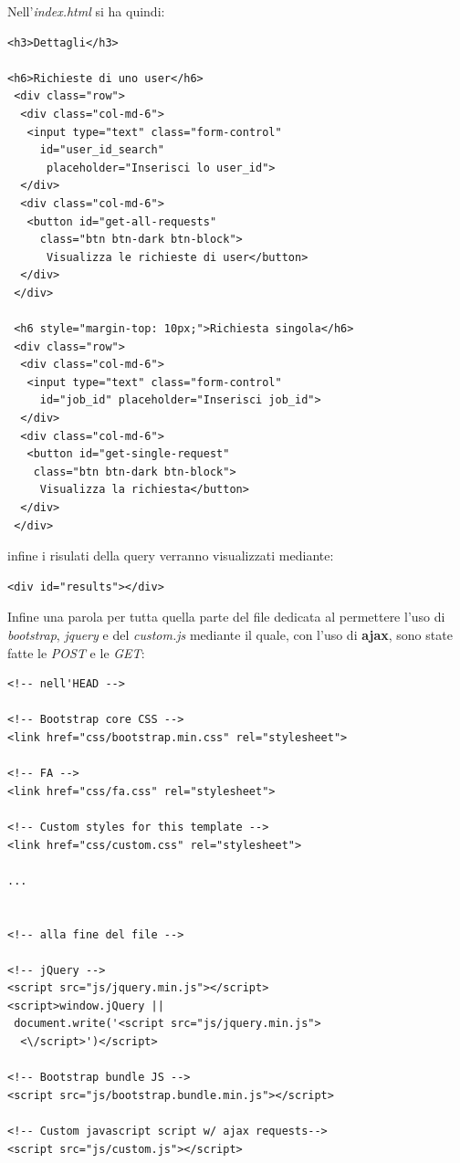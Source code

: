 \documentclass[a4paper,12pt, oneside]{book}
\begin{document}
\newpage
Nell'\textit{index.html} si ha quindi:
\begin{center}
\begin{verbatim}
<h3>Dettagli</h3>

<h6>Richieste di uno user</h6>
 <div class="row">
  <div class="col-md-6">
   <input type="text" class="form-control"
     id="user_id_search"
      placeholder="Inserisci lo user_id">
  </div>
  <div class="col-md-6">
   <button id="get-all-requests"
     class="btn btn-dark btn-block">
      Visualizza le richieste di user</button>
  </div>
 </div>

 <h6 style="margin-top: 10px;">Richiesta singola</h6>
 <div class="row">
  <div class="col-md-6">
   <input type="text" class="form-control"
     id="job_id" placeholder="Inserisci job_id">
  </div>
  <div class="col-md-6">
   <button id="get-single-request"
    class="btn btn-dark btn-block">
     Visualizza la richiesta</button>
  </div>
 </div>
\end{verbatim}
\end{center}
infine i risulati della query verranno visualizzati mediante:
\begin{shaded}
\begin{verbatim}
<div id="results"></div>
\end{verbatim}
\end{shaded}
\newpage
Infine una parola per tutta quella parte del file dedicata al permettere l'uso di \textit{bootstrap}, \textit{jquery}
e del \textit{custom.js} mediante il quale, con l'uso di \textbf{ajax}, sono state fatte le \textit{POST} e le \textit{GET}:
\begin{shaded}
\begin{verbatim}
<!-- nell'HEAD -->
    
<!-- Bootstrap core CSS -->
<link href="css/bootstrap.min.css" rel="stylesheet">

<!-- FA -->
<link href="css/fa.css" rel="stylesheet">

<!-- Custom styles for this template -->
<link href="css/custom.css" rel="stylesheet">

...


<!-- alla fine del file -->

<!-- jQuery -->
<script src="js/jquery.min.js"></script>
<script>window.jQuery ||
 document.write('<script src="js/jquery.min.js">
  <\/script>')</script>
    
<!-- Bootstrap bundle JS -->
<script src="js/bootstrap.bundle.min.js"></script>

<!-- Custom javascript script w/ ajax requests-->
<script src="js/custom.js"></script>
\end{verbatim}
\end{shaded}
\end{document}
